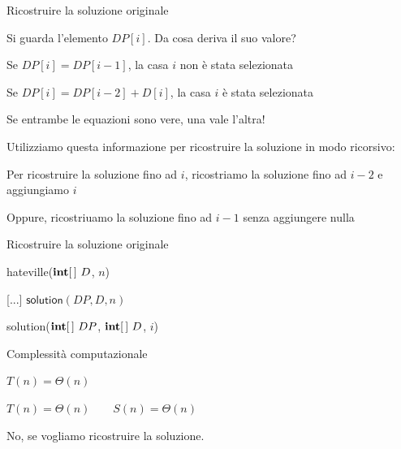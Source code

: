 \begin{frame}[fragile]{Ricostruire la soluzione originale}

\BIL
\item Si guarda l'elemento $DP[i]$. Da cosa deriva il suo valore?
  \BI 
  \item Se $DP[i] = DP[i-1]$, la casa $i$ non è stata selezionata
  \item Se $DP[i] = DP[i-2]+D[i]$, la casa $i$ è stata selezionata
  \item Se entrambe le equazioni sono vere, una vale l'altra!
  \EI
\item Utilizziamo questa informazione per ricostruire la soluzione in modo
  ricorsivo:
  \BI
  \item Per ricostruire la soluzione fino ad $i$,
  ricostriamo la soluzione fino ad $i-2$ e aggiungiamo $i$
  \item Oppure, ricostriuamo la soluzione fino ad $i-1$ senza aggiungere nulla
  \EI
\EIL

\end{frame}

\begin{frame}[fragile]{Ricostruire la soluzione originale}

\vspace{-12pt}
\begin{Procedure}
\caption[A]{\textsf{hateville}($\INTEGER[\,]\ D$, \INTEGER $n$)}
[...]\;
\Return $\textsf{solution}(DP, D, n)$\;
\end{Procedure}

\vspace{-12pt}
\begin{Procedure}
\caption[A]{\textsf{solution}($\INTEGER[\,]\ DP$, $\INTEGER[\,]\ D$, \INTEGER $i$)}
\end{Procedure}

\end{frame}

\begin{frame}{Complessità computazionale}

\medskip  
$T(n) = \Theta(n)$

\bigskip
{}
\medskip  
$T(n) = \Theta(n) \qquad S(n) = \Theta(n)$

\bigskip
{}
\medskip
No, se vogliamo ricostruire la soluzione.

\end{frame}

